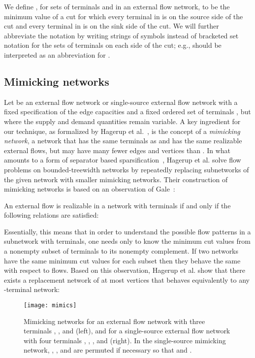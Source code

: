 \documentclass[runningheads]{llncs}
\begin{document}
We define , for sets of terminals  and  in an external flow network, to be the minimum value of a cut for which every terminal in  is on the source side of the cut and every terminal in  is on the sink side of the cut. We will further abbreviate the notation by writing strings of symbols instead of bracketed set notation for the sets of terminals on each side of the cut; e.g.,  should be interpreted as an abbreviation for .

\subsection{Mimicking networks}

Let  be an external flow network or single-source external flow network with a fixed specification of the edge capacities and a fixed ordered set of terminals , but where the supply and demand quantities  remain variable. A key ingredient for our technique, as formalized by Hagerup et al.~\cite{hknr-cmfnc-98}, is the concept of a \emph{mimicking network}, a network  that has the same terminals as  and has the same realizable external flows, but may have many fewer edges and vertices than .  In what amounts to a form of separator based sparsification~\cite{egis-sbs-93}, Hagerup et al.{} solve flow problems on bounded-treewidth networks by repeatedly replacing subnetworks of the given network with smaller mimicking networks.
Their construction of mimicking networks is based on an observation of Gale~\cite{gale}:

\begin{lemma} \cite{hknr-cmfnc-98} \label{hagerup}
An external flow  is realizable in a network  with terminals  if and only if the following relations are satisfied:

\end{lemma}

Essentially, this means that in order to understand the possible flow patterns in a subnetwork with  terminals, one needs only to know the  minimum cut values from a nonempty subset of terminals to its nonempty complement. If two networks have the same minimum cut values for each subset then they behave the same with respect to flows.  Based on this observation, Hagerup et al.{} show that there exists a replacement network of at most  vertices that behaves equivalently to any -terminal network:

\begin{figure}[t]
\centering\texttt{[image: mimics]}
\caption{Mimicking networks for an external flow network with three terminals , , and  (left), and for a single-source external flow network with four terminals , , , and  (right). In the single-source mimicking network, , , and  are permuted if necessary so that  and .}
\label{mimics}
\end{figure}
\end{document}

